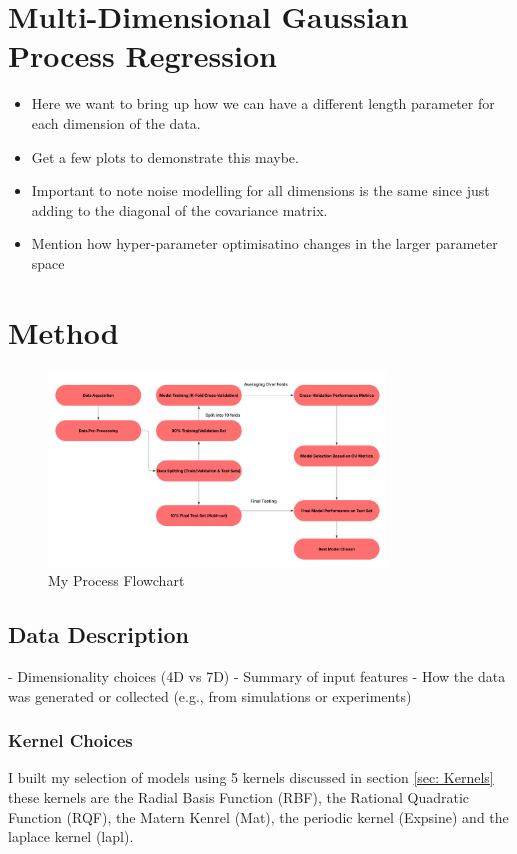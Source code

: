 \documentclass{article}
\begin{document}
\section{Multi-Dimensional Gaussian Process Regression}

\begin{itemize}
    \item Here we want to bring up how we can have a different length parameter for each dimension of the data.
    \item Get a few plots to demonstrate this maybe.
    \item Important to note noise modelling for all dimensions is the same since just adding to the diagonal of the covariance matrix.
    \item Mention how hyper-parameter optimisatino changes in the larger parameter space
\end{itemize}


\section{Method}

\begin{figure}[H]
    \centering
    \includegraphics[width=0.8\textwidth]{LatexPlots/Flowchart.png}
    \caption{My Process Flowchart}
    \label{fig:flowchart}
\end{figure}

\subsection{Data Description}
- Dimensionality choices (4D vs 7D)
- Summary of input features
- How the data was generated or collected (e.g., from simulations or experiments)

\subsubsection*{Kernel Choices}
I built my selection of models using 5 kernels discussed in section \ref{sec: Kernels} these kernels are the 
Radial Basis Function (RBF), the Rational Quadratic Function (RQF), the Matern Kenrel (Mat), the periodic kernel (Expsine) and the laplace kernel (lapl).
\end{document}
